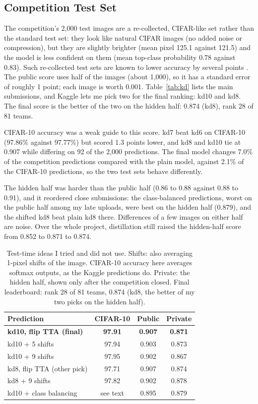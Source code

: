 \documentclass[letterpaper]{article}
\begin{document}
\subsection{Competition Test Set}
The competition's 2,000 test images are a re-collected, CIFAR-like set rather than the standard test set: they look
like natural CIFAR images (no added noise or compression), but they are slightly brighter (mean pixel 125.1 against
121.5) and the model is less confident on them (mean top-class probability 0.78 against 0.83). Such re-collected test
sets are known to lower accuracy by several points \cite{recht2019imagenet}. The public score uses half of the images
(about 1,000), so it has a standard error of roughly 1 point; each image is worth 0.001. Table~\ref{tab:kd} lists the
main submissions, and Kaggle lets me pick two for the final ranking: kd10 and kd8. The final score is the better of
the two on the hidden half: 0.874 (kd8), rank 28 of 81 teams.

CIFAR-10 accuracy was a weak guide to this score. kd7 beat kd6 on CIFAR-10 (97.86\% against 97.77\%) but scored 1.3
points lower, and kd8 and kd10 tie at 0.907 while differing on 92 of the 2,000 predictions. The final model changes
7.0\% of the competition predictions compared with the plain model, against 2.1\% of the CIFAR-10 predictions, so the
two test sets behave differently.

The hidden half was harder than the public half (0.86 to 0.88 against 0.88 to 0.91), and it reordered close
submissions: the class-balanced predictions, worst on the public half among my late uploads, were best on the hidden
half (0.879), and the shifted kd8 beat plain kd8 there. Differences of a few images on either half are noise. Over the
whole project, distillation still raised the hidden-half score from 0.852 to 0.871 to 0.874.

\begin{table}[t]
\centering
\small
\setlength{\tabcolsep}{4pt}
\begin{tabular}{lccc}
\toprule
Prediction & CIFAR-10 & Public & Private \\
\midrule
\textbf{kd10, flip TTA (final)} & \textbf{97.91} & \textbf{0.907} & \textbf{0.871} \\
kd10 + 5 shifts & 97.94 & 0.903 & 0.873 \\
kd10 + 9 shifts & 97.95 & 0.902 & 0.867 \\
kd8, flip TTA (other pick) & 97.71 & 0.907 & 0.874 \\
kd8 + 9 shifts & 97.82 & 0.902 & 0.878 \\
kd10 + class balancing & see text & 0.895 & 0.879 \\
\bottomrule
\end{tabular}
\caption{Test-time ideas I tried and did not use. Shifts: also averaging 1-pixel shifts of the image. CIFAR-10 accuracy
here averages softmax outputs, as the Kaggle predictions do. Private: the hidden half, shown only after the competition
closed. Final leaderboard: rank 28 of 81 teams, 0.874 (kd8, the better of my two picks on the hidden half).}
\label{tab:kaggle}
\end{table}
\end{document}

